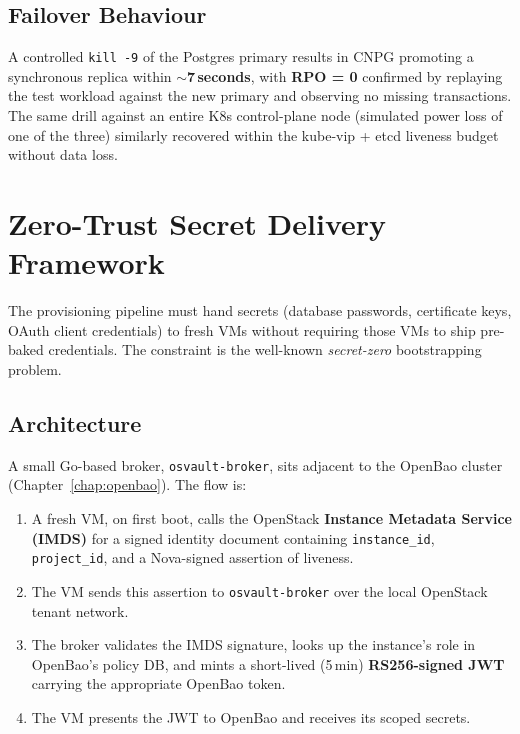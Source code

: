 \documentclass[12pt,a4paper,oneside]{report}
\begin{document}
\subsection{Failover Behaviour}

A controlled \texttt{kill -9} of the Postgres primary results in CNPG promoting a synchronous replica within \textbf{$\sim$7\,seconds}, with \textbf{RPO = 0} confirmed by replaying the test workload against the new primary and observing no missing transactions. The same drill against an entire K8s control-plane node (simulated power loss of one of the three) similarly recovered within the kube-vip + etcd liveness budget without data loss.

\section{Zero-Trust Secret Delivery Framework}

The provisioning pipeline must hand secrets (database passwords, certificate keys, OAuth client credentials) to fresh VMs without requiring those VMs to ship pre-baked credentials. The constraint is the well-known \emph{secret-zero} bootstrapping problem.

\subsection{Architecture}

A small Go-based broker, \texttt{osvault-broker}, sits adjacent to the OpenBao cluster (Chapter~\ref{chap:openbao}). The flow is:

\begin{enumerate}[leftmargin=*]
    \item A fresh VM, on first boot, calls the OpenStack \textbf{Instance Metadata Service (IMDS)} for a signed identity document containing \texttt{instance\_id}, \texttt{project\_id}, and a Nova-signed assertion of liveness.
    \item The VM sends this assertion to \texttt{osvault-broker} over the local OpenStack tenant network.
    \item The broker validates the IMDS signature, looks up the instance's role in OpenBao's policy DB, and mints a short-lived (5\,min) \textbf{RS256-signed JWT} carrying the appropriate OpenBao token.
    \item The VM presents the JWT to OpenBao and receives its scoped secrets.
\end{enumerate}
\end{document}
